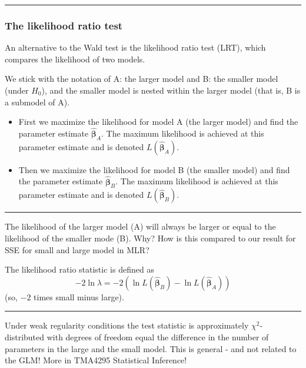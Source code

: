 \documentclass[
]{article}
\providecommand{\tightlist}{%
  \setlength{\itemsep}{0pt}\setlength{\parskip}{0pt}}
\begin{document}
\begin{center}\rule{0.5\linewidth}{0.5pt}\end{center}

\hypertarget{the-likelihood-ratio-test}{%
\subsubsection{The likelihood ratio
test}\label{the-likelihood-ratio-test}}

An alternative to the Wald test is the likelihood ratio test (LRT),
which compares the likelihood of two models.

We stick with the notation of A: the larger model and B: the smaller
model (under \(H_0\)), and the smaller model is nested within the larger
model (that is, B is a submodel of A).

\begin{itemize}
\tightlist
\item
  First we maximize the likelihood for model A (the larger model) and
  find the parameter estimate \(\hat{\boldsymbol{\beta}}_A\). The
  maximum likelihood is achieved at this parameter estimate and is
  denoted \(L(\hat{\boldsymbol{\beta}}_A)\).
\item
  Then we maximize the likelihood for model B (the smaller model) and
  find the parameter estimate \(\hat{\boldsymbol{\beta}}_B\). The
  maximum likelihood is achieved at this parameter estimate and is
  denoted \(L(\hat{\boldsymbol{\beta}}_B)\).
\end{itemize}

\begin{center}\rule{0.5\linewidth}{0.5pt}\end{center}

The likelihood of the larger model (A) will always be larger or equal to
the likelihood of the smaller mode (B). Why? How is this compared to our
result for SSE for small and large model in MLR?

The likelihood ratio statistic is defined as
\[- 2\ln \lambda=-2(\ln L(\hat{\boldsymbol{\beta}}_B)-\ln L(\hat{\boldsymbol{\beta}}_A)) \]
(so, \(-2\) times small minus large).

\begin{center}\rule{0.5\linewidth}{0.5pt}\end{center}

Under weak regularity conditions the test statistic is approximately
\(\chi^2\)-distributed with degrees of freedom equal the difference in
the number of parameters in the large and the small model. This is
general - and not related to the GLM! More in TMA4295 Statistical
Inference!
\end{document}
